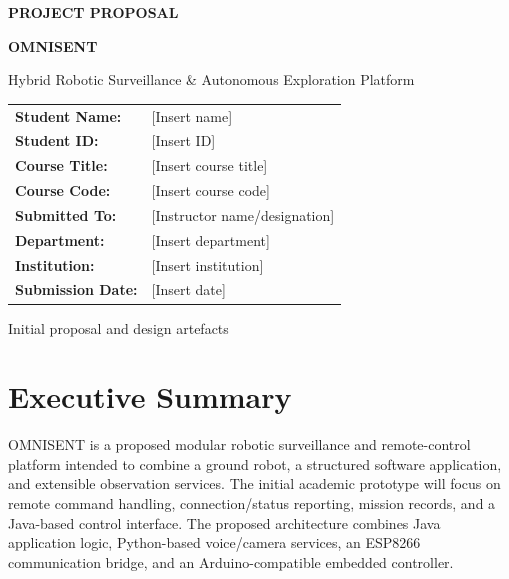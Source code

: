 \documentclass[12pt,a4paper]{article}
\begin{document}
\begin{titlepage}\centering\vspace*{1.1cm}
{\Large\bfseries PROJECT PROPOSAL\par}\vspace{0.8cm}
{\Huge\bfseries\color{navy} OMNISENT\par}\vspace{0.25cm}
{\Large Hybrid Robotic Surveillance \& Autonomous Exploration Platform\par}\vspace{0.8cm}
\vspace{1cm}
\begin{tabular}{>{\bfseries}p{4cm}p{7cm}}
Student Name: & [Insert name] \\
Student ID: & [Insert ID] \\
Course Title: & [Insert course title] \\
Course Code: & [Insert course code] \\
Submitted To: & [Instructor name/designation] \\
Department: & [Insert department] \\
Institution: & [Insert institution] \\
Submission Date: & [Insert date] \\
\end{tabular}
\vfill{\large Initial proposal and design artefacts\par}\end{titlepage}
\tableofcontents\newpage{}

\section{Executive Summary}
OMNISENT is a proposed modular robotic surveillance and remote-control platform intended to combine a ground robot, a structured software application, and extensible observation services. The initial academic prototype will focus on remote command handling, connection/status reporting, mission records, and a Java-based control interface. The proposed architecture combines Java application logic, Python-based voice/camera services, an ESP8266 communication bridge, and an Arduino-compatible embedded controller.
\end{document}
